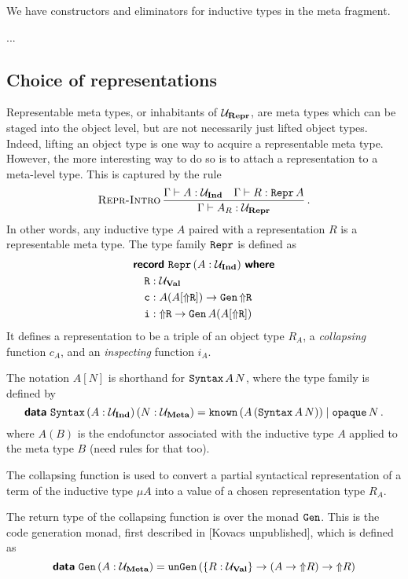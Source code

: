 We have constructors and eliminators for inductive types in the meta fragment.

...

\subsection{Choice of representations}

Representable meta types, or inhabitants of $\Ur$, are meta types which can be
staged into the object level, but are not necessarily just lifted object types.
Indeed, lifting an object type is one way to acquire a representable meta type.
However, the more interesting way to do so is to attach a representation to a
meta-level type. This is captured by the rule
\[
  \infrule[Repr-Intro]{\Gamma \vdash A : \Ui \quad \Gamma \vdash R : \defin{Repr}\,A}
  {\Gamma \vdash A_R : \Ur} \,.
\]
In other words, any inductive type $A$ paired with a representation $R$ is a
representable meta type. The type family $\Repr$ is defined as
\begin{align*}
   & \recordwhere[\,(A: \Ui)]{Repr}                                                \\
   & \quad \defin{R} : \Uv                                                         \\
   & \quad    \defin{c} : A(A [\lift{\defin R}]) \to \Gen \, \lift{\defin R} \quad \\
   & \quad    \defin{i} : \lift{\defin R} \to \Gen \, A(A [\lift{\defin R}])
\end{align*}
It defines a representation to be a triple of an object type $R_A$, a
\emph{collapsing} function $c_A$, and an \emph{inspecting} function $i_A$.

The notation $A[N]$ is shorthand for $\defin{Syntax}\,A\,N$, where the
 type family is defined by
\[
  \data{Syntax} \,(A : \Ui)\,(N : \Um) = \defin{known} \, (A\,(\defin{Syntax}\,A\,N)) \mid \defin{opaque} \, N \,.
\]
where $A(B)$ is the endofunctor associated with the inductive type $A$ applied
to the meta type $B$ (need rules for that too).

The collapsing function is used to convert a partial syntactical representation
of a term of the inductive type $\mu A$ into a value of a chosen representation
type $R_A$.

The return type of the collapsing function is over the monad $\Gen$. This is
the code generation monad, first described in [Kovacs unpublished], which is
defined as
\[
  \data{Gen} \, (A : \Um) = \defin{unGen} \, (\{ R : \Uv \} \to (A \to \lift R) \to \lift R)
\]

